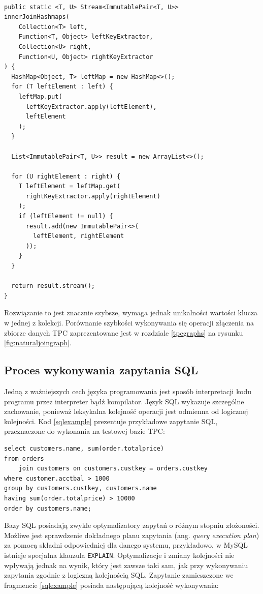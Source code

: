 \documentclass[12pt,twoside,openright]{extarticle}
\begin{document}
\begin{lstlisting}[label=join3, caption=Propozycja rozwiązania nr 3]

public static <T, U> Stream<ImmutablePair<T, U>> 
innerJoinHashmaps(
    Collection<T> left,
    Function<T, Object> leftKeyExtractor,
    Collection<U> right,
    Function<U, Object> rightKeyExtractor
) {
  HashMap<Object, T> leftMap = new HashMap<>();
  for (T leftElement : left) {
    leftMap.put(
      leftKeyExtractor.apply(leftElement),
      leftElement
    );
  }
  
  List<ImmutablePair<T, U>> result = new ArrayList<>();
  
  for (U rightElement : right) {
    T leftElement = leftMap.get(
      rightKeyExtractor.apply(rightElement)
    );
    if (leftElement != null) {
      result.add(new ImmutablePair<>(
        leftElement, rightElement
      ));
    }
  }
  
  return result.stream();
}
\end{lstlisting}

Rozwiązanie to jest znacznie szybsze, wymaga jednak unikalności wartości klucza w jednej z kolekcji. Porównanie szybkości wykonywania się operacji złączenia na zbiorze danych TPC zaprezentowane jest w rozdziale \ref{tpcgraphs} na rysunku \ref{fig:naturaljoingraph}.


\subsection{Proces wykonywania zapytania SQL}

    Jedną z ważniejszych cech języka programowania jest sposób interpretacji kodu programu przez interpreter bądź kompilator. Język SQL wykazuje szczególne zachowanie, ponieważ leksykalna kolejność operacji jest odmienna od logicznej kolejności. Kod \ref{sqlexample} prezentuje przykładowe zapytanie SQL, przeznaczone do wykonania na testowej bazie TPC:


\begin{lstlisting}[label=sqlexample, caption=Przykład kolejności wykonywania zapytania SQL]
select customers.name, sum(order.totalprice)
from orders 
    join customers on customers.custkey = orders.custkey
where customer.acctbal > 1000
group by customers.custkey, customers.name
having sum(order.totalprice) > 10000
order by customers.name;
\end{lstlisting}

    Bazy SQL posiadają zwykle optymalizatory zapytań o różnym stopniu złożoności. Możliwe jest sprawdzenie dokładnego planu zapytania (ang. \textit{query execution plan}) za pomocą składni odpowiedniej dla danego systemu, przykładowo, w MySQL istnieje specjalna klauzula \texttt{EXPLAIN}. Optymalizacje i zmiany kolejności nie wpływają jednak na wynik, który jest zawsze taki sam, jak przy wykonywaniu zapytania zgodnie z logiczną kolejnością SQL. Zapytanie zamieszczone we fragmencie \ref{sqlexample} posiada następującą kolejność wykonywania:
\end{document}
